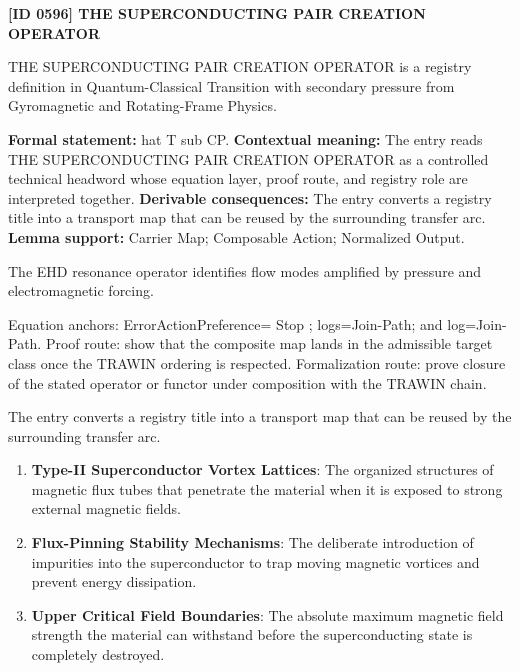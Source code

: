 \clearpage
\noindent\textbf{[ID 0596] THE SUPERCONDUCTING PAIR CREATION OPERATOR}\par
\vspace{0.35em}
\begingroup\small
{}
THE SUPERCONDUCTING PAIR CREATION OPERATOR is a registry definition in Quantum-Classical Transition with secondary pressure from Gyromagnetic and Rotating-Frame Physics.

\begingroup\footnotesize\setlength{\emergencystretch}{3em}\sloppy
\textbf{Formal statement:} hat T sub CP. \textbf{Contextual meaning:} The entry reads THE SUPERCONDUCTING PAIR CREATION OPERATOR as a controlled technical headword whose equation layer, proof route, and registry role are interpreted together. \textbf{Derivable consequences:} The entry converts a registry title into a transport map that can be reused by the surrounding transfer arc. \textbf{Lemma support:} Carrier Map; Composable Action; Normalized Output.\par
\endgroup

The EHD resonance operator identifies flow modes amplified by pressure and electromagnetic forcing.

Equation anchors: ErrorActionPreference= Stop ; logs=Join-Path; and log=Join-Path. Proof route: show that the composite map lands in the admissible target class once the TRAWIN ordering is respected. Formalization route: prove closure of the stated operator or functor under composition with the TRAWIN chain.

The entry converts a registry title into a transport map that can be reused by the surrounding transfer arc.
\endgroup

\begin{enumerate}[leftmargin=1.6em,itemsep=6pt,topsep=4pt]
\item \textbf{Type-II Superconductor Vortex Lattices}: The organized structures of magnetic flux tubes that penetrate the material when it is exposed to strong external magnetic fields.
\item \textbf{Flux-Pinning Stability Mechanisms}: The deliberate introduction of impurities into the superconductor to trap moving magnetic vortices and prevent energy dissipation.
\item \textbf{Upper Critical Field Boundaries}: The absolute maximum magnetic field strength the material can withstand before the superconducting state is completely destroyed.
\end{enumerate}


